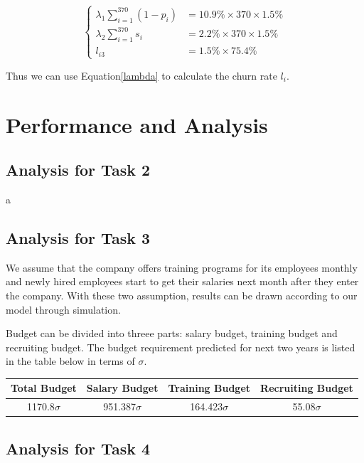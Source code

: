 \documentclass[12pt,a4paper,titlepage]{article}
\begin{document}
\begin{equation}
\label{lambda}
\begin{cases}
  \lambda_1 \sum_{i=1}^{370}(1-p_i) & =10.9\% \times 370 \times 1.5\% \\
  \lambda_2 \sum_{i=1}^{370}s_i & =2.2\% \times 370 \times 1.5\% \\
  l_{i3} & =1.5 \% \times 75.4 \%
\end{cases}
\end{equation}

Thus we can use Equation\ref{lambda} to calculate the churn rate $l_i$.

\section{Performance and Analysis}
\label{sec:performance-and-analysis}

\subsection{Analysis for Task 2}
\label{sec:analysis-for-task-2}

a

\subsection{Analysis for Task 3}
\label{sec:analysis-for-task-3}

We assume that the company offers training programs for its employees monthly and newly hired employees start to get their salaries next month after they enter the company. With these two assumption, results can be drawn according to our model through simulation.

Budget can be divided into threee parts: salary budget, training budget and recruiting budget. The budget requirement predicted for next two years is listed in the table below in terms of $\sigma$.

\begin{tabular}{*{4}{c}}\toprule[2pt]
Total Budget & Salary Budget & Training Budget & Recruiting Budget\\ \midrule
1170.8$\sigma$ & 951.387$\sigma$ & 164.423$\sigma$ & 55.08$\sigma$ \\ \bottomrule[2pt]
\end{tabular}

\subsection{Analysis for Task 4}
\label{sec:analysis-for-task-4}
\end{document}
